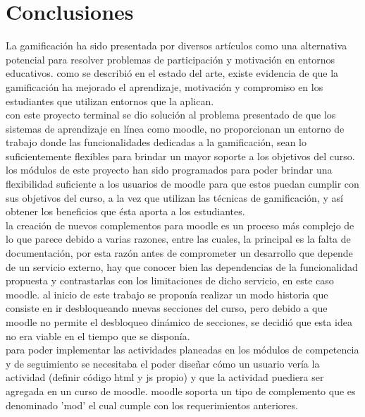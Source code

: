 
\section{Conclusiones}

La gamificación ha sido presentada por diversos artículos como una alternativa potencial para resolver problemas de participación y motivación en entornos educativos. como se describió  en el estado del arte, existe evidencia de que la gamificación ha mejorado el aprendizaje, motivación y compromiso en los estudiantes que utilizan entornos que la aplican.\\

\noindent con este proyecto terminal se dio solución al problema presentado de que los sistemas de aprendizaje en línea como moodle, no proporcionan un entorno de trabajo donde las funcionalidades dedicadas a la gamificación, sean lo suficientemente flexibles
para brindar un mayor soporte a los objetivos del curso.\\

\noindent los módulos de este proyecto han sido programados para poder brindar una flexibilidad suficiente a los usuarios de moodle para que estos puedan cumplir con sus objetivos del curso, a la vez que utilizan las técnicas de gamificación, y así obtener los beneficios que ésta aporta a los estudiantes.\\

\noindent la creación de nuevos complementos para moodle es un proceso más complejo de lo que parece debido a varias razones, entre las cuales, la principal es la falta de documentación, por esta razón antes de comprometer  un desarrollo que depende de un servicio externo, hay que conocer bien las dependencias de la funcionalidad propuesta y contrastarlas con los limitaciones de dicho servicio, en este caso moodle. al inicio de este trabajo se proponía  realizar un modo historia que consiste en ir desbloqueando nuevas secciones del curso, pero debido  a que moodle no permite el desbloqueo dinámico de secciones, se decidió que esta idea no era viable en el tiempo que se disponía.\\

\noindent para poder implementar las actividades planeadas en los módulos de competencia y de seguimiento se necesitaba el poder diseñar
cómo un usuario vería la actividad (definir código html y js propio) y que la actividad puediera ser agregada en un curso de moodle. moodle soporta 
un tipo de complemento que es denominado 'mod' el cual cumple con los requerimientos anteriores.\\

